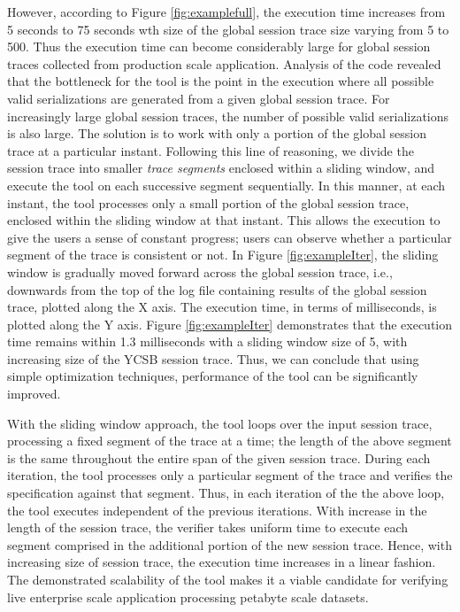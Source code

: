 \documentclass[journal,compsoc]{IEEEtran}
\begin{document}
 \par However, according to Figure \ref{fig:examplefull}, the execution time increases from 5 seconds to 75 seconds wth size of the global session trace size varying from 5 to 500. Thus the execution time can become considerably large for global session traces collected from production scale application. %
 Analysis of the code revealed that the bottleneck for the tool is the point in the execution where all possible valid serializations are generated from a given global  session trace. For increasingly large global session traces, the number of possible valid serializations is also large. The solution is to work with only a portion of the global session trace at a particular instant. Following this line of reasoning, we divide the session trace into smaller \emph{trace segments} enclosed within a sliding window, and execute  the tool on  each successive segment sequentially. In this manner, at each instant, the tool processes only a small portion of the global session trace, enclosed within the sliding window at that instant. This allows the execution to give the users a sense of constant progress; users can observe whether a particular segment of the trace is consistent or not. In Figure \ref{fig:exampleIter}, the sliding window is gradually moved forward across the global session trace, i.e., downwards from the top of the log file containing results of the global session trace, plotted along the X axis. The execution time, in terms of milliseconds, is plotted along the Y axis. Figure  \ref{fig:exampleIter} %
  demonstrates that the execution time remains within %
   1.3 milliseconds with a sliding window size of %
  5, %
  with increasing size of the YCSB session trace.  Thus, we can conclude that using simple optimization techniques, performance of the tool can be significantly improved. 
  \par With the sliding window approach, the tool loops over the input session trace, processing a fixed segment of the trace at a time; the length of the above segment is the same throughout the entire span of the given session trace. During each iteration, the tool processes only a particular segment of the trace and verifies the specification against that segment. Thus, in each iteration of the the above loop, the tool executes  independent of the previous iterations. With increase in the length of the session trace, the verifier takes uniform time to execute each segment comprised in the additional portion of the new session trace. Hence, with increasing size of session trace, the execution time increases in a linear fashion. The demonstrated scalability of the tool makes it a  viable candidate for verifying live enterprise scale application processing petabyte scale datasets.  
\end{document}
